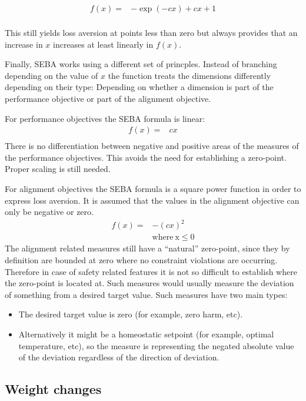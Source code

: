 \begin{align}
f(x)= &  -\exp(-cx)+cx+1 \\ \nonumber
\end{align}

This still yields loss aversion at points less than zero but always provides that an increase in $x$ increases at least linearly in $f(x)$.


Finally, SEBA works using a different set of princples. Instead of branching depending on the value of $x$ the function treats the dimensions differently depending on their type: Depending on whether a dimension is part of the performance objective or part of the alignment objective.

For performance objectives the SEBA formula is linear:
\begin{align}
f(x)= &  cx \\ \nonumber
\end{align}
There is no differentiation between negative and positive areas of the measures of the performance objectives. This avoids the need for establishing a zero-point. Proper scaling is still needed.

For alignment objectives the SEBA formula is a square power function in order to express loss aversion. It is assumed that the values in the alignment objective can only be negative or zero.
\begin{align}
f(x)= &  -(cx)^2 \\ \nonumber
  &  \mathrm{ where \: x \leq 0}
\end{align}
The alignment related measures still have a “natural” zero-point, since they by definition are bounded at zero where no constraint violations are occurring. Therefore in case of safety related features it is not so difficult to establish where the zero-point is located at. Such measures would usually measure the deviation of something from a desired target value. Such measures have two main types:
\begin{itemize}
    \item The desired target value is zero (for example, zero harm, etc).
    \item Alternatively it might be a homeostatic setpoint (for example, optimal temperature, etc), so the measure is representing the negated absolute value of the deviation regardless of the direction of deviation.
\end{itemize}

\subsection{Weight changes}

